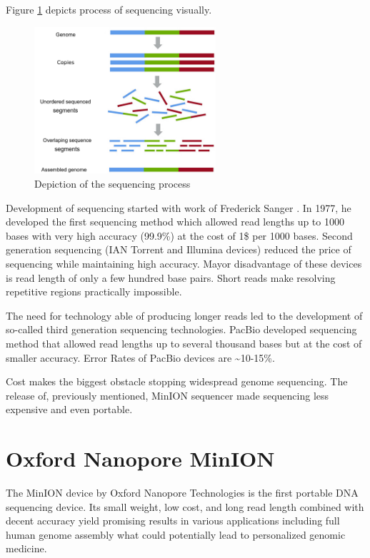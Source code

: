 \documentclass[times, utf8, diplomski, english]{fer}
\begin{document}
Figure \ref{fg:sequencing} depicts process of sequencing visually.

\begin{figure}[!ht]
    \begin{center}
        \includegraphics[width=0.6\textwidth]{shotgun-sequencing}
        \caption{Depiction of the sequencing process}
        \label{fg:sequencing}
    \end{center}
\end{figure}


Development of sequencing started with work of Frederick Sanger \cite{mile} \cite{Pettersson2009}. In 1977, he developed the first sequencing method which allowed 
read lengths up to 1000 bases with very high accuracy (99.9\%) at the cost of 1\$ per 1000 bases.
Second generation sequencing (IAN Torrent and Illumina devices) reduced the price of sequencing while maintaining high accuracy. Mayor disadvantage of these devices is read length of only a few hundred base pairs. Short reads make resolving repetitive regions practically impossible.

The need for technology able of producing longer reads led to the development of so-called third generation sequencing technologies.
PacBio developed sequencing method that allowed read lengths up to several thousand bases but at the cost of smaller accuracy. Error Rates of PacBio devices are \textasciitilde10-15\%. 

Cost makes the biggest obstacle stopping widespread genome sequencing. The release of, previously mentioned, MinION sequencer made sequencing less expensive and even portable.

\section{Oxford Nanopore MinION}

The MinION device by Oxford Nanopore Technologies is the first portable DNA sequencing device. Its small weight, low cost, and long read length combined with decent accuracy yield promising results in various applications including full human genome assembly \cite{human_seq} what could potentially lead to personalized genomic medicine.
\end{document}
